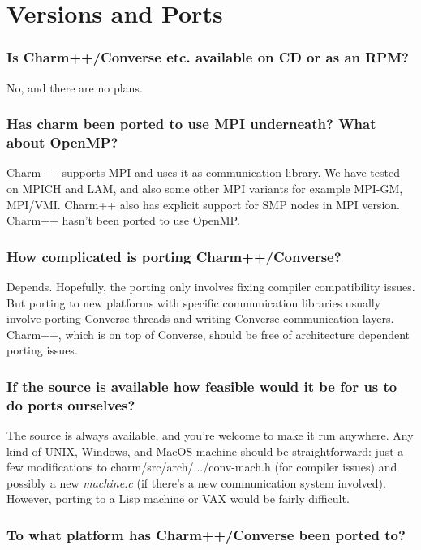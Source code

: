 \section{Versions and Ports}

\subsubsection{Is Charm++/Converse etc. available on CD or as an RPM?}

No, and there are no plans.

\subsubsection{Has charm been ported to use MPI underneath? What about OpenMP?}

Charm++ supports MPI and uses it as communication library. We
have tested on MPICH and LAM, and also some other MPI variants for example
MPI-GM, MPI/VMI. Charm++ also has explicit support for SMP nodes in MPI
version. Charm++ hasn't been ported to use OpenMP.

\subsubsection{How complicated is porting Charm++/Converse?}

Depends. Hopefully, the porting only involves fixing compiler compatibility
issues. But porting to new platforms with specific communication libraries
usually involve porting Converse threads and writing Converse communication
layers. Charm++, which is on top of Converse, should be free of architecture
dependent porting issues.

\subsubsection{If the source is available how feasible would it be for us to do ports
ourselves?}

The source is always available, and you're welcome to make it run anywhere.
Any kind of UNIX, Windows, and MacOS machine should be straightforward: just a
few modifications to \textrm{charm/src/arch/.../conv-mach.h} (for compiler
issues) and possibly
a new {\em machine.c} (if there's a new communication system involved).
However, porting to a Lisp machine or VAX would be fairly difficult.

\subsubsection{To what platform has Charm++/Converse been ported to?}


